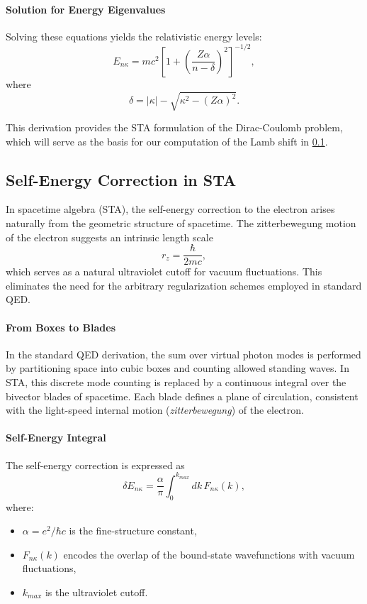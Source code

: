\documentclass[12pt]{article}
\begin{document}
\paragraph{Solution for Energy Eigenvalues}
Solving these equations yields the relativistic energy levels:
\[
E_{n\kappa} = mc^2\left[1+\left(\frac{Z\alpha}{n-\delta}\right)^2\right]^{-1/2},
\]
where
\[
\delta = |\kappa|-\sqrt{\kappa^2-(Z\alpha)^2}.
\]

This derivation provides the STA formulation of the Dirac-Coulomb problem, which will serve as the basis for our computation of the Lamb shift in \ref{subsec:sta_self_energy_correction}.


\subsection{Self-Energy Correction in STA}\label{subsec:sta_self_energy_correction}

In spacetime algebra (STA), the self-energy correction to the electron arises naturally from the geometric structure of spacetime. The zitterbewegung motion of the electron suggests an intrinsic length scale
\[
r_z = \frac{\hbar}{2mc},
\]
which serves as a natural ultraviolet cutoff for vacuum fluctuations. This eliminates the need for the arbitrary regularization schemes employed in standard QED.

\paragraph{From Boxes to Blades}
In the standard QED derivation, the sum over virtual photon modes is performed by partitioning space into cubic boxes and counting allowed standing waves. In STA, this discrete mode counting is replaced by a continuous integral over the bivector blades of spacetime. Each blade defines a plane of circulation, consistent with the light-speed internal motion (\emph{zitterbewegung}) of the electron.

\paragraph{Self-Energy Integral}
The self-energy correction is expressed as
\[
\delta E_{n\kappa} = \frac{\alpha}{\pi}\int_0^{k_{max}} dk\,F_{n\kappa}(k),
\]
where:
\begin{itemize}
    \item \(\alpha = e^2/\hbar c\) is the fine-structure constant,
    \item \(F_{n\kappa}(k)\) encodes the overlap of the bound-state wavefunctions with vacuum fluctuations,
    \item \(k_{max}\) is the ultraviolet cutoff.
\end{itemize}
\end{document}
